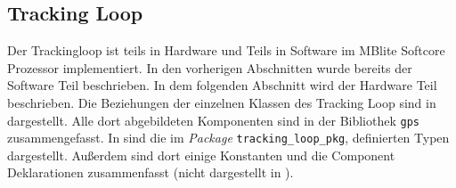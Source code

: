 \subsection{Tracking Loop}
Der Trackingloop ist teils in Hardware und Teils in Software im MBlite Softcore Prozessor implementiert. In den vorherigen Abschnitten wurde bereits der Software Teil beschrieben. In dem folgenden Abschnitt wird der Hardware Teil beschrieben. Die Beziehungen der einzelnen Klassen des Tracking Loop sind in  dargestellt. Alle dort abgebildeten Komponenten sind in der Bibliothek \lstinline$gps$ zusammengefasst. In  sind die im \emph{Package} \lstinline$tracking_loop_pkg$, definierten Typen dargestellt. Außerdem sind dort einige Konstanten und die Component Deklarationen zusammenfasst (nicht dargestellt in ).













